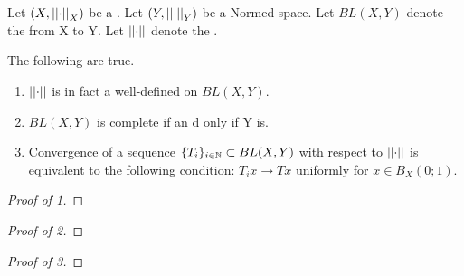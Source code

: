 \begin{prop} 
\label{prop:BLO} 
Let $(X,\left|\left| \cdot \right|\right|_X)$ be a \SeminormedSpace. 
Let $(Y, \left|\left| \cdot \right|\right|_Y)$ be a Normed space.
Let $BL(X,Y)$ denote the \SpaceOfBoundedLinearOperators from X to Y. 
Let $\left|\left| \cdot \right|\right|$ denote the \OperatorNorm. 

The following are true. 
\begin{enumerate}
\item $\left|\left| \cdot \right|\right|$ is in fact a well-defined \Norm on $BL(X,Y)$. 
\item $BL(X,Y)$ is complete if an d only if Y is. 
\item Convergence of a sequence $\{T_i\}_{i \in \mathbb{N}} \subset BL(X,Y)$ with respect to $\left|\left| \cdot \right|\right|$
is equivalent to the following condition: $T_ix \to Tx$ uniformly for $x \in B_X(0;1)$. 
\end{enumerate}


\begin{proof}[Proof of 1] 

\end{proof}
\begin{proof}[Proof of 2] 
\end{proof}
\begin{proof}[Proof of 3] 
\end{proof}


\end{prop}
